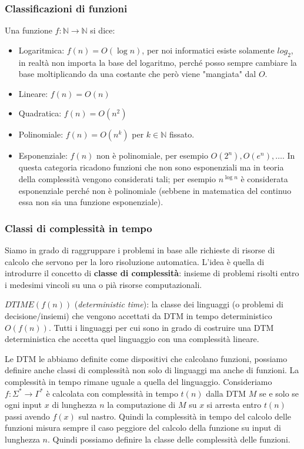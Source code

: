 \documentclass{article}
\begin{document}
\subsubsection{Classificazioni di funzioni}
Una funzione $f:\mathbb{N}\rightarrow\mathbb{N}$ si dice:
\begin{itemize}
    \item Logaritmica: $f(n)=O(\log n)$, per noi informatici esiste solamente $log_2$,
          in realtà non importa la base del logaritmo, perché posso sempre cambiare la base
          moltiplicando da una costante che però viene "mangiata" dal $O$.
    \item Lineare: $f(n)=O(n)$
    \item Quadratica: $f(n)=O(n^2)$
    \item Polinomiale: $f(n)=O(n^k)$ per $k\in\mathbb{N}$ fissato.
    \item Esponenziale: $f(n)$ non è polinomiale, per esempio $O(2^n),O(e^n),\dots$. In questa
          categoria ricadono funzioni che non sono esponenziali ma in teoria della complessità
          vengono considerati tali; per esempio $n^{\log n}$ è considerata esponenziale
          perché non è polinomiale (sebbene in matematica del continuo essa non sia una funzione
          esponenziale).
\end{itemize}

\subsubsection{Classi di complessità in tempo}
Siamo in grado di raggruppare i problemi in base alle richieste di risorse di calcolo
che servono per la loro risoluzione automatica. L'idea è quella di introdurre il concetto
di \textbf{classe di complessità}: insieme di problemi risolti entro i medesimi vincoli
su una o pià risorse computazionali.\mbox{}\newline

$DTIME(f(n))$ (\textit{deterministic time}): la classe dei linguaggi
(o problemi di decisione/insiemi) che vengono
accettati da DTM in tempo deterministico $O(f(n))$. Tutti i linguaggi per cui sono in grado
di costruire una DTM deterministica che accetta quel linguaggio con una complessità lineare.

Le DTM le abbiamo definite come dispositivi che calcolano funzioni, possiamo definire
anche classi di complessità non solo di linguaggi ma anche di funzioni. La complessità
in tempo rimane uguale a quella del linguaggio. Consideriamo $f:\Sigma^*\rightarrow\Gamma^*$
è calcolata con complessità in tempo $t(n)$ dalla DTM $M$ se e solo se ogni input $x$
di lunghezza $n$ la computazione di $M$ su $x$ si arresta entro $t(n)$ passi avendo $f(x)$
sul nastro. Quindi la complessità in tempo del calcolo delle funzioni misura sempre il caso peggiore
del calcolo della funzione su input di lunghezza $n$. Quindi possiamo definire
la classe delle complessità delle funzioni.\mbox{}\newline
\end{document}
